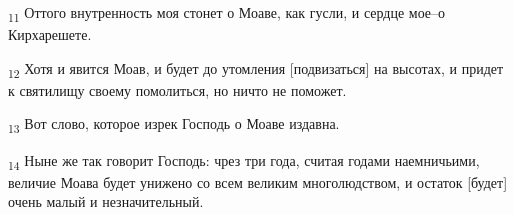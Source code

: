\begin{tcolorbox}
\textsubscript{11} Оттого внутренность моя стонет о Моаве, как гусли, и сердце мое--о Кирхарешете.
\end{tcolorbox}
\begin{tcolorbox}
\textsubscript{12} Хотя и явится Моав, и будет до утомления [подвизаться] на высотах, и придет к святилищу своему помолиться, но ничто не поможет.
\end{tcolorbox}
\begin{tcolorbox}
\textsubscript{13} Вот слово, которое изрек Господь о Моаве издавна.
\end{tcolorbox}
\begin{tcolorbox}
\textsubscript{14} Ныне же так говорит Господь: чрез три года, считая годами наемничьими, величие Моава будет унижено со всем великим многолюдством, и остаток [будет] очень малый и незначительный.
\end{tcolorbox}
